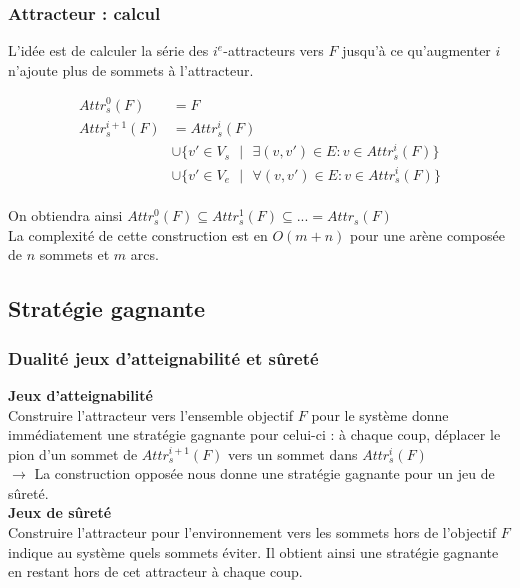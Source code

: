 \documentclass{beamer}
\begin{document}
\begin{frame}
\frametitle{Attracteur : calcul}
L'idée est de calculer la série des $i^e$-attracteurs vers $F$ jusqu'à ce qu'augmenter $i$ n'ajoute plus de sommets à l'attracteur.

\begin{equation}
\label{eq:induction}
\begin{split}
Attr^0_{s}(F)&=F\\
Attr^{i+1}_{s}(F)&=Attr^i_{s}(F)\\
			&\cup \{v'\in V_s\text{ }|\text{ }\exists(v,v')\in E:v\in Attr^i_{s}(F)\}\\
			&\cup \{v'\in V_e\text{ }|\text{ }\forall(v,v')\in E:v\in Attr^i_{s}(F)\}
\end{split}
\end{equation}\\
On obtiendra ainsi $Attr_{s}^0(F)\subseteq Attr_{s}^1(F) \subseteq ...=Attr_s(F)$\\[3mm]
La complexité de cette construction est en \alert{$O(m+n)$} pour une arène composée de $n$ sommets et $m$ arcs.
\end{frame}

\subsection{Stratégie gagnante}
\begin{frame}
\frametitle{Dualité jeux d'atteignabilité et sûreté}
\textbf{Jeux d'atteignabilité}\\
Construire l'attracteur vers l'ensemble objectif $F$ pour le système donne immédiatement une stratégie gagnante pour celui-ci : à chaque coup, déplacer le pion d'un sommet de $Attr_{s}^{i+1}(F)$ vers un sommet dans $Attr_{s}^{i}(F)$\\[3mm]

$\rightarrow$ La construction opposée nous donne une stratégie gagnante pour un jeu de sûreté.\\[3mm]

\textbf{Jeux de sûreté}\\
Construire l'attracteur pour l'environnement vers les sommets hors de l'objectif $F$ indique au système quels sommets éviter. Il obtient ainsi une stratégie gagnante en restant hors de cet attracteur à chaque coup.
\end{frame}
\end{document}
